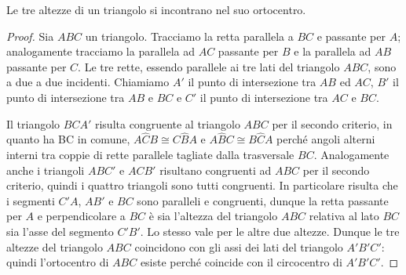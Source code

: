 \begin{teorema}
Le tre altezze di un triangolo si incontrano nel suo ortocentro.
\end{teorema}


\begin{proof}
Sia $ABC$ un triangolo. Tracciamo la retta parallela a $BC$ e passante per $A$; analogamente tracciamo la parallela ad $AC$ passante per $B$ e la parallela ad $AB$ passante per $C$. Le tre rette, essendo parallele ai tre lati del triangolo $ABC$, sono a due a due incidenti. Chiamiamo $A'$ il punto di intersezione tra $AB$ ed $AC$, $B'$ il punto di intersezione tra $AB$ e $BC$ e $C'$ il punto di intersezione tra $AC$ e $BC$.

Il triangolo $BCA'$ risulta congruente al triangolo $ABC$ per il secondo criterio, in quanto ha BC in comune, $A\widehat{C}B\cong C\widehat{B}A$ e $A\widehat{B}C\cong B\widehat{C}A$ perché angoli alterni interni tra coppie di rette parallele tagliate dalla trasversale $BC$. Analogamente anche i triangoli $ABC'$ e $ACB'$ risultano congruenti ad $ABC$ per il secondo criterio, quindi i quattro triangoli sono tutti congruenti. In particolare risulta che i segmenti $C'A$, $AB'$ e $BC$ sono paralleli e congruenti, dunque la retta passante per $A$ e perpendicolare a $BC$ è sia l'altezza del triangolo $ABC$ relativa al lato $BC$ sia l'asse del segmento $C'B'$. Lo stesso vale per le altre due altezze. Dunque le tre altezze del triangolo $ABC$ coincidono con gli assi dei lati del triangolo $A'B'C'$: quindi l'ortocentro di $ABC$ esiste perché coincide con il circocentro di $A'B'C'$.
\end{proof}

